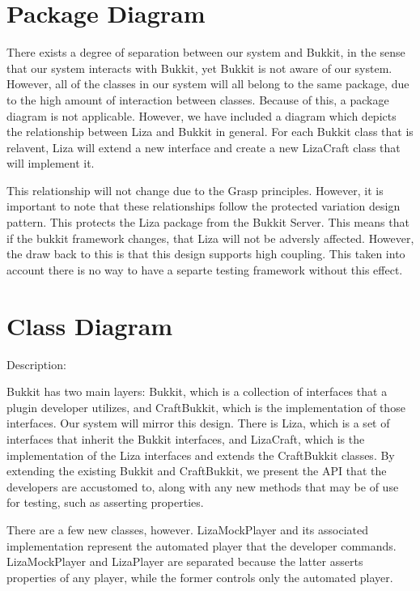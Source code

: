 \documentclass{article}
\begin{document}
\section{Package Diagram}

There exists a degree of separation between our system and Bukkit, in the
sense that our system interacts with Bukkit, yet Bukkit is not aware of our
system. However, all of the classes in our system will all belong to the same
package, due to the high amount of interaction between classes. Because
of this, a package diagram is not applicable.  However, we have included a 
diagram which depicts the relationship between Liza and Bukkit in general.
For each Bukkit class that is relavent, Liza will extend a new interface and 
create a new LizaCraft class that will implement it. \newline 

\noindent This relationship will not change due to the Grasp principles.  However, it is important to 
note that these relationships follow the protected variation design pattern.  This protects the Liza
package from the Bukkit Server.  This means that if the bukkit framework changes, that Liza will not be adversly
affected.  However, the draw back to this is that this design supports high coupling.  This taken into account there
is no way to have a separte testing framework without this effect.



\section{Class Diagram}

Description:
\newline

\noindent
Bukkit has two main layers: Bukkit, which is a collection of interfaces that
a plugin developer utilizes, and CraftBukkit, which is the implementation
of those interfaces. Our system will mirror this design. There is Liza, which
is a set of interfaces that inherit the Bukkit interfaces, and LizaCraft, which
is the implementation of the Liza interfaces and extends the CraftBukkit classes.
By extending the existing Bukkit and CraftBukkit, we present the API that
the developers are accustomed to, along with any new methods that may
be of use for testing, such as asserting properties. 
\newline

\noindent
There are a few new classes, however. LizaMockPlayer and its associated
implementation represent the automated player that the developer
commands. LizaMockPlayer and LizaPlayer are separated because the
latter asserts properties of any player, while the former controls only
the automated player.
\newline
\end{document}

